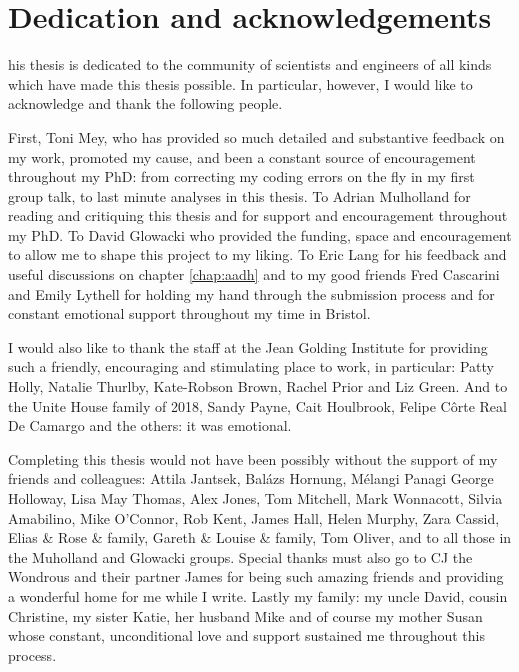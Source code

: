 %
%

\chapter*{Dedication and acknowledgements}
\begin{SingleSpace}
his thesis is dedicated to the community of scientists and engineers of all kinds which have made this thesis possible. In particular, however, I would like to acknowledge and thank the following people. 

First, Toni Mey, who has provided so much detailed and substantive feedback on my work, promoted my cause, and been a constant source of encouragement throughout my PhD: from correcting my coding errors on the fly in my first group talk, to last minute analyses in this thesis. To Adrian Mulholland for reading and critiquing this thesis and for support and encouragement throughout my PhD. To David Glowacki who provided the funding, space and encouragement to allow me to shape this project to my liking. To Eric Lang for his feedback and useful discussions on chapter \ref{chap:aadh} and to my good friends Fred Cascarini and Emily Lythell for holding my hand through the submission process and for constant emotional support throughout my time in Bristol.  

I would also like to thank the staff at the Jean Golding Institute for providing such a friendly, encouraging and stimulating place to work, in particular: Patty Holly, Natalie Thurlby, Kate-Robson Brown, Rachel Prior and Liz Green. And to the Unite House family of 2018, Sandy Payne, Cait Houlbrook, Felipe C\^{o}rte Real De Camargo and the others: it was emotional. 

Completing this thesis would not have been possibly without the support of my friends and colleagues: Attila Jantsek, Bal\'azs Hornung, M\'{e}langi Panagi George Holloway, Lisa May Thomas, Alex Jones, Tom Mitchell, Mark Wonnacott, Silvia Amabilino, Mike O'Connor, Rob Kent, James Hall,  Helen Murphy, Zara Cassid, Elias \& Rose \& family, Gareth \& Louise \& family, Tom Oliver, and to all those in the Muholland and Glowacki groups. Special thanks must also go to CJ the Wondrous and their partner James for being such amazing friends and providing a wonderful home for me while I write. Lastly my family: my uncle David, cousin Christine, my sister Katie, her husband Mike and of course my mother Susan whose constant, unconditional love and support sustained me throughout this process. 

\end{SingleSpace}
\clearpage